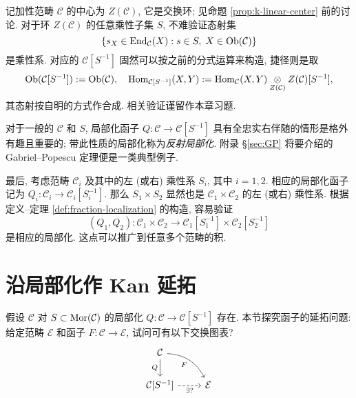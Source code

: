\begin{example}[中心局部化]\label{eg:central-localization}
	记加性范畴 $\mathcal{C}$ 的中心为 $Z(\mathcal{C})$, 它是交换环; 见命题 \ref{prop:k-linear-center} 前的讨论. 对于环 $Z(\mathcal{C})$ 的任意乘性子集 $S$, 不难验证态射集 
	\[ \{s_X \in \operatorname{End}_{\mathcal{C}}(X): s \in S, \; X \in \operatorname{Ob}(\mathcal{C}) \} \]
	是乘性系. 对应的 $\mathcal{C}[S^{-1}]$ 固然可以按之前的分式运算来构造, 捷径则是取
	\[ \operatorname{Ob}(\mathcal{C}[S^{-1}]) := \operatorname{Ob}(\mathcal{C}), \quad \operatorname{Hom}_{\mathcal{C}[S^{-1}]}(X, Y) := \operatorname{Hom}_{\mathcal{C}}(X, Y) \underset{Z(\mathcal{C})}{\otimes} Z(\mathcal{C})[S^{-1}], \]
	其态射按自明的方式作合成. 相关验证谨留作本章习题.
\end{example}

\begin{remark}\label{rem:reflexive-localization}
	对于一般的 $\mathcal{C}$ 和 $S$, 局部化函子 $Q: \mathcal{C} \to \mathcal{C}[S^{-1}]$ 具有全忠实右伴随的情形是格外有趣且重要的; 带此性质的局部化称为\emph{反射局部化}. 附录 \S\ref{sec:GP} 将要介绍的 Gabriel--Popescu 定理便是一类典型例子.
\end{remark}

\begin{remark}[积范畴的局部化]\label{rem:localization-product-cat}
	最后, 考虑范畴 $\mathcal{C}_i$ 及其中的左 (或右) 乘性系 $S_i$, 其中 $i = 1, 2$. 相应的局部化函子记为 $Q_i: \mathcal{C}_i \to \mathcal{C}_i[S_i^{-1}]$. 那么 $S_1 \times S_2$ 显然也是 $\mathcal{C}_1 \times \mathcal{C}_2$ 的左 (或右) 乘性系. 根据定义--定理 \ref{def:fraction-localization} 的构造, 容易验证
	\[ (Q_1, Q_2): \mathcal{C}_1 \times \mathcal{C}_2 \to \mathcal{C}_1[S_1^{-1}] \times \mathcal{C}_2[S_2^{-1}] \]
	是相应的局部化. 这点可以推广到任意多个范畴的积.
\end{remark}

\section{沿局部化作 Kan 延拓}\label{sec:functor-localization}
假设 $\mathcal{C}$ 对 $S \subset \operatorname{Mor}(\mathcal{C})$ 的局部化 $Q: \mathcal{C} \to \mathcal{C}[S^{-1}]$ 存在. 本节探究函子的延拓问题: 给定范畴 $\mathcal{E}$ 和函子 $F: \mathcal{C} \to \mathcal{E}$, 试问可有以下交换图表?
\[\begin{tikzcd}
	\mathcal{C} \arrow[d, "Q"'] \arrow[rd, bend left, "F"'] & \\
	\mathcal{C}{[S^{-1}]} \arrow[dashed, r, "\exists? "'] & \mathcal{E}
\end{tikzcd}\]

